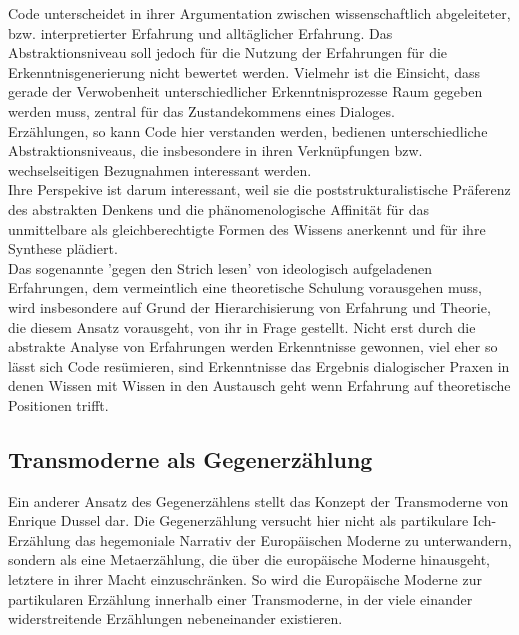 \noindent Code unterscheidet in ihrer Argumentation zwischen wissenschaftlich
abgeleiteter, bzw. interpretierter Erfahrung und alltäglicher Erfahrung. Das
Abstraktionsniveau soll jedoch für die Nutzung der Erfahrungen für die
Erkenntnisgenerierung nicht bewertet werden. Vielmehr ist die Einsicht, dass
gerade der Verwobenheit unterschiedlicher Erkenntnisprozesse Raum gegeben werden
muss, zentral für das Zustandekommens eines Dialoges.\footnotemark
{}\\

\noindent Erzählungen, so kann Code hier verstanden werden, bedienen unterschiedliche
Abstraktionsniveaus, die insbesondere in ihren Verknüpfungen bzw.
wechselseitigen Bezugnahmen interessant werden.\\
Ihre Perspekive ist darum interessant, weil sie die poststrukturalistische
Präferenz des abstrakten Denkens und die phänomenologische Affinität für das
unmittelbare als gleichberechtigte Formen des Wissens anerkennt und für ihre
Synthese plädiert. \\
Das sogenannte 'gegen den Strich lesen' von ideologisch
aufgeladenen Erfahrungen, dem vermeintlich eine theoretische Schulung
vorausgehen muss, wird insbesondere auf Grund der Hierarchisierung von Erfahrung
und Theorie, die diesem Ansatz vorausgeht, von ihr in Frage gestellt. Nicht erst
durch die abstrakte Analyse von  Erfahrungen werden Erkenntnisse gewonnen, viel
eher so lässt sich Code resümieren, sind Erkenntnisse das Ergebnis dialogischer
Praxen in denen Wissen mit Wissen in den Austausch geht wenn Erfahrung auf
theoretische Positionen trifft.

\subsection{Transmoderne als Gegenerzählung}

Ein anderer Ansatz des Gegenerzählens stellt das Konzept der Transmoderne von
Enrique Dussel dar. Die Gegenerzählung versucht hier nicht als partikulare
Ich-Erzählung das hegemoniale Narrativ der Europäischen Moderne zu unterwandern,
sondern als eine Metaerzählung, die über die europäische Moderne hinausgeht,
letztere in ihrer Macht einzuschränken. So wird die Europäische Moderne zur
partikularen Erzählung innerhalb einer Transmoderne, in der viele einander
widerstreitende Erzählungen nebeneinander existieren.\\

